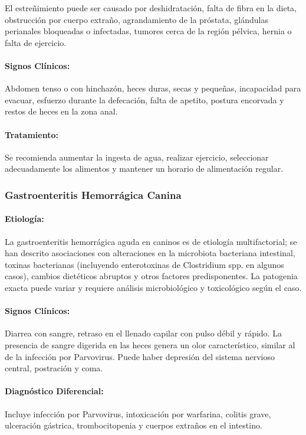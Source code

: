             El estreñimiento puede ser causado por deshidratación, falta de fibra en la dieta, obstrucción por cuerpo extraño, agrandamiento de la próstata, glándulas perianales bloqueadas o infectadas, tumores cerca de la región pélvica, hernia o falta de ejercicio.

            \paragraph{Signos Clínicos:} Abdomen tenso o con hinchazón, heces duras, secas y pequeñas, incapacidad para evacuar, esfuerzo durante la defecación, falta de apetito, postura encorvada y restos de heces en la zona anal.

            \paragraph{Tratamiento:} Se recomienda aumentar la ingesta de agua, realizar ejercicio, seleccionar adecuadamente los alimentos y mantener un horario de alimentación regular.

        \subsubsection{Gastroenteritis Hemorrágica Canina}

            \paragraph{Etiología:} La gastroenteritis hemorrágica aguda en caninos es de etiología multifactorial; se han descrito asociaciones con alteraciones en la microbiota bacteriana intestinal, toxinas bacterianas (incluyendo enterotoxinas de Clostridium spp. en algunos casos), cambios dietéticos abruptos y otros factores predisponentes. La patogenia exacta puede variar y requiere análisis microbiológico y toxicológico según el caso.

            \paragraph{Signos Clínicos:} Diarrea con sangre, retraso en el llenado capilar con pulso débil y rápido. La presencia de sangre digerida en las heces genera un olor característico, similar al de la infección por Parvovirus. Puede haber depresión del sistema nervioso central, postración y coma.

            \paragraph{Diagnóstico Diferencial:} Incluye infección por Parvovirus, intoxicación por warfarina, colitis grave, ulceración gástrica, trombocitopenia y cuerpos extraños en el intestino.

